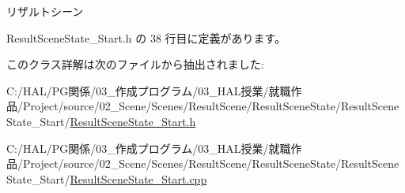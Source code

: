 リザルトシーン 



 Result\+Scene\+State\+\_\+\+Start.\+h の 38 行目に定義があります。



このクラス詳解は次のファイルから抽出されました\+:\begin{DoxyCompactItemize}
\item 
C\+:/\+H\+A\+L/\+P\+G関係/03\+\_\+作成プログラム/03\+\_\+\+H\+A\+L授業/就職作品/\+Project/source/02\+\_\+\+Scene/\+Scenes/\+Result\+Scene/\+Result\+Scene\+State/\+Result\+Scene\+State\+\_\+\+Start/\mbox{\hyperlink{_result_scene_state___start_8h}{Result\+Scene\+State\+\_\+\+Start.\+h}}\item 
C\+:/\+H\+A\+L/\+P\+G関係/03\+\_\+作成プログラム/03\+\_\+\+H\+A\+L授業/就職作品/\+Project/source/02\+\_\+\+Scene/\+Scenes/\+Result\+Scene/\+Result\+Scene\+State/\+Result\+Scene\+State\+\_\+\+Start/\mbox{\hyperlink{_result_scene_state___start_8cpp}{Result\+Scene\+State\+\_\+\+Start.\+cpp}}\end{DoxyCompactItemize}
